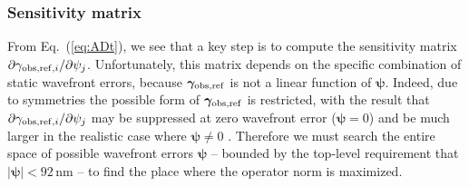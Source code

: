 \documentclass[aps,prd, amsmath,amssymb,superscriptaddress,showkeys,nofootinbib,reprint,preprintnumbers]{revtex4-1}
\begin{document}
\begin{widetext}
\subsubsection{Sensitivity matrix}
\label{as:drift-sens}

From Eq.~(\ref{eq:ADt}), we see that a key step is to compute the
sensitivity matrix $\partial \gamma_{{\rm
obs,ref},i}/\partial\psi_j$. Unfortunately, this matrix depends on the
specific combination of static wavefront errors, because
${\boldsymbol\gamma}_{\rm obs,ref}$ is not a linear function of
${\boldsymbol\psi}$. Indeed, due to symmetries the possible form of
${\boldsymbol\gamma}_{\rm obs,ref}$ is restricted, with the result
that $\partial \gamma_{{\rm obs,ref},i}/\partial\psi_j$ may be
suppressed at zero wavefront error (${\boldsymbol\psi}=0$) and be much
larger in the realistic case where ${\boldsymbol\psi}\neq 0$
\citep[e.g.][]{2010SPIE.7731E..1EN}. Therefore we must search the
entire space of possible wavefront errors ${\boldsymbol\psi}$ --
bounded by the top-level requirement that $|{\boldsymbol\psi}|<92\,$nm
-- to find the place where the operator norm is maximized.


\end{widetext}
\end{document}

